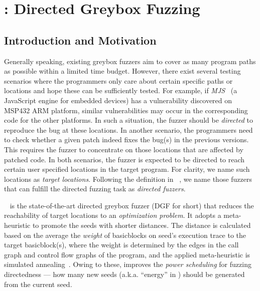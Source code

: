 
\chapter{\dFOT: Directed Greybox Fuzzing} \label{ch:dfot}


\section{Introduction and Motivation}


Generally speaking, existing greybox fuzzers aim to cover as many program paths as possible within a limited time budget.
However, there exist several testing scenarios where the programmers only care about certain specific paths or locations and hope these can be sufficiently tested. 
For example, if \emph{MJS}~\cite{mjs} (a JavaScript engine for embedded devices) has a vulnerability discovered on MSP432 ARM platform, similar vulnerabilities may occur in the corresponding code for the other platforms.
In such a situation, the fuzzer should be \emph{directed} to reproduce the bug at these locations.
In another scenario, the programmers need to check whether a given patch indeed fixes the bug(s) in the previous versions. 
This requires the fuzzer to concentrate on those locations that are affected by patched code.
In both scenarios, the fuzzer is expected to be directed to reach certain user specified locations in the target program.
For clarity, we name such locations as \emph{target locations}.
Following the definition in {\aflgo}~\cite{Bohme:2017:DGF}, we name those fuzzers that can fulfill the directed fuzzing task as \emph{directed fuzzers}.



{\aflgo}~\cite{Bohme:2017:DGF} is the state-of-the-art directed greybox fuzzer (DGF for short) that reduces the reachability of target locations to an \emph{optimization problem}. It adopts a meta-heuristic to promote the  seeds with shorter distances. The distance is calculated based on the average the \emph{weight} of basicblocks on seed's execution trace to the target basicblock(s), where the weight
 is determined by the edges in the call graph and control flow graphs of the program, and the applied meta-heuristic is simulated annealing~\cite{kirkpatrick1983optimization}.
Owing to these, \aflgo improves the \emph{power scheduling} for fuzzing directedness --- how many new seeds (a.k.a. ``energy'' in \aflgo) should be generated from the current seed.

